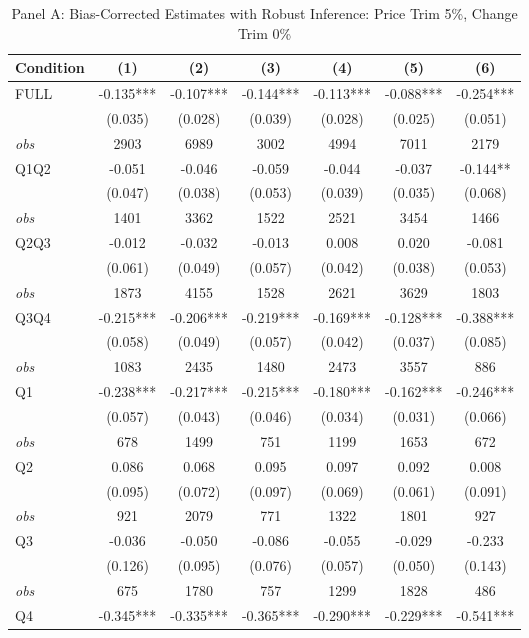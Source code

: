 \begin{table}[!htbp]
\centering
\caption{Panel A: Bias-Corrected Estimates with Robust Inference: Price Trim 5\%, Change Trim 0\%}
\begin{tabular}{lcccccc}
\hline
Condition & (1) & (2) & (3) & (4) & (5) & (6) \\
\hline
FULL & -0.135*** & -0.107*** & -0.144*** & -0.113*** & -0.088*** & -0.254*** \\
 & (0.035) & (0.028) & (0.039) & (0.028) & (0.025) & (0.051) \\
\textit{obs} & 2903 & 6989 & 3002 & 4994 & 7011 & 2179 \\
Q1Q2 & -0.051 & -0.046 & -0.059 & -0.044 & -0.037 & -0.144** \\
 & (0.047) & (0.038) & (0.053) & (0.039) & (0.035) & (0.068) \\
\textit{obs} & 1401 & 3362 & 1522 & 2521 & 3454 & 1466 \\
Q2Q3 & -0.012 & -0.032 & -0.013 & 0.008 & 0.020 & -0.081 \\
 & (0.061) & (0.049) & (0.057) & (0.042) & (0.038) & (0.053) \\
\textit{obs} & 1873 & 4155 & 1528 & 2621 & 3629 & 1803 \\
Q3Q4 & -0.215*** & -0.206*** & -0.219*** & -0.169*** & -0.128*** & -0.388*** \\
 & (0.058) & (0.049) & (0.057) & (0.042) & (0.037) & (0.085) \\
\textit{obs} & 1083 & 2435 & 1480 & 2473 & 3557 & 886 \\
Q1 & -0.238*** & -0.217*** & -0.215*** & -0.180*** & -0.162*** & -0.246*** \\
 & (0.057) & (0.043) & (0.046) & (0.034) & (0.031) & (0.066) \\
\textit{obs} & 678 & 1499 & 751 & 1199 & 1653 & 672 \\
Q2 & 0.086 & 0.068 & 0.095 & 0.097 & 0.092 & 0.008 \\
 & (0.095) & (0.072) & (0.097) & (0.069) & (0.061) & (0.091) \\
\textit{obs} & 921 & 2079 & 771 & 1322 & 1801 & 927 \\
Q3 & -0.036 & -0.050 & -0.086 & -0.055 & -0.029 & -0.233 \\
 & (0.126) & (0.095) & (0.076) & (0.057) & (0.050) & (0.143) \\
\textit{obs} & 675 & 1780 & 757 & 1299 & 1828 & 486 \\
Q4 & -0.345*** & -0.335*** & -0.365*** & -0.290*** & -0.229*** & -0.541*** \\

\end{tabular}
\end{table}
